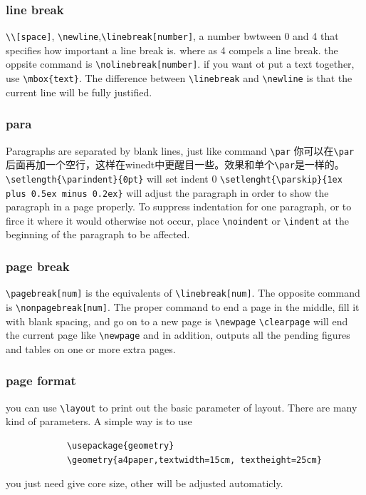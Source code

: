 \documentclass[a4paper,12pt,twoside]{book}
\begin{document}
\begin{CJK*}{UTF8}{song}
		\subsubsection{line break}
			\verb=\\[space]=, \verb=\newline=,\verb=\linebreak[number]=, a number bwtween 0 and 4 that specifies how important a line break is. where as 4 compels a line break. the oppsite command is \verb=\nolinebreak[number]=.  if you want ot put a text together, use \verb=\mbox{text}=.
			The difference between \verb=\linebreak= and \verb=\newline= is that the current line will be fully justified.
		\subsubsection{para}
			Paragraphs are separated by blank lines, just like command \verb=\par= 你可以在\verb=\par= 后面再加一个空行，这样在winedt中更醒目一些。效果和单个\verb=\par=是一样的。
			\verb=\setlength{\parindent}{0pt}= will set indent 0 \linebreak
			\verb=\setlenght{\parskip}{1ex plus 0.5ex minus 0.2ex}= will adjust the paragraph in order to show the paragraph in a page properly. To suppress indentation for one paragraph, or to firce it where it would otherwise not occur, place \verb=\noindent= or \verb=\indent= at the beginning of the paragraph to be affected.
		\subsubsection{page break}
			\verb=\pagebreak[num]= is the equivalents of \verb=\linebreak[num]=. The opposite command is \verb=\nonpagebreak[num]=. The proper command to end a page in the middle, fill it with blank spacing, and go on to a new page is \verb=\newpage=
			\verb=\clearpage= will end the current page like \verb=\newpage= and in addition, outputs all the pending figures and tables on one or more extra pages.
		\subsubsection{page format}
			you can use \verb=\layout= to print out the basic parameter of layout. There are many kind of parameters. A simple way is to use
			\begin{verbatim}
			\usepackage{geometry}
			\geometry{a4paper,textwidth=15cm, textheight=25cm}
			\end{verbatim}
			you just need give core size, other will be adjusted automaticly.

\end{CJK*}
\end{document}
